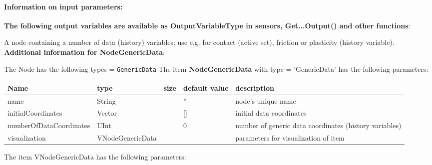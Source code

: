 \paragraph{Information on input parameters:} 
\finishTable
{\bf The following output variables are available as OutputVariableType in sensors, Get...Output() and other functions}: 
\finishTable
\newpage

\label{sec:item:NodeGenericData}
A node containing a number of data (history) variables; use e.g. for contact (active set), friction or plasticity (history variable).\vspace{12pt}
 \\{\bf Additional information for NodeGenericData}:
\bi
  \item The Node has the following types = \texttt{GenericData}
\ei
\vspace{12pt} \noindent The item {\bf NodeGenericData} with type = 'GenericData' has the following parameters:\vspace{-1cm}\\ 
\begin{center}
  \footnotesize
  \begin{longtable}{| p{4.5cm} | p{2.5cm} | p{0.5cm} | p{2.5cm} | p{6cm} |}
    \hline
    \bf Name & \bf type & \bf size & \bf default value & \bf description \\ \hline
    name &     String &      &     '' &     node's unique name\\ \hline
    initialCoordinates &     Vector &      &     [] &     initial data coordinates\\ \hline
    numberOfDataCoordinates &     UInt &      &     0 &     number of generic data coordinates (history variables)\\ \hline
    visualization & VNodeGenericData & & & parameters for visualization of item \\ \hline
	  \end{longtable}
	\end{center}
The item VNodeGenericData has the following parameters:\vspace{-1cm}\\ 
